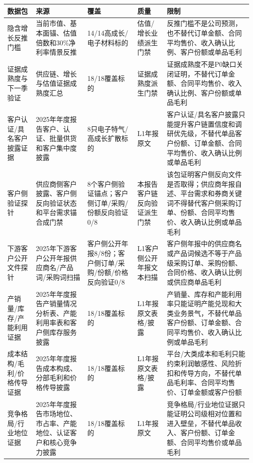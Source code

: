 \begin{exhibitbox}[结构化数据源健康（3）]
\scriptsize
\begin{tabularx}{\exhibitboxwidth}{L{2.1cm} L{2.4cm} L{2.4cm} L{1.5cm} X}
\toprule
\textbf{数据包} & \textbf{来源} & \textbf{覆盖} & \textbf{质量} & \textbf{限制} \\
\midrule
隐含增长反推门槛 & 当前市值、基本面锚、估值倍数和30\%净利率情景反推 & 14/14高成长/电子材料标的 & 估值/增长业绩派生门禁 & 反推门槛不是公司预测，也不替代订单金额、合同平均售价、收入确认比例、客户份额或单品毛利 \\
证据成熟度与下一季验证 & 供应链、增长与估值证据成熟度汇总 & 18/18覆盖标的 & 证据成熟度派生门禁 & 证据成熟度不是P0缺口关闭证明，不替代订单金额、合同平均售价、收入确认比例、客户份额或单品毛利 \\
客户认证/具名客户披露证据 & 2025年年度报告客户、认证、批量供货和客户集中度披露 & 8只电子特气/高成长扩散标的 & L1年报原文 & 客户认证/具名客户披露只能提升客户链置信度和调研优先级，不替代单品客户份额、订单金额、合同平均售价、收入确认比例或单品毛利 \\
客户侧验证探针 & 供应商侧客户披露、客户侧反向验证状态和平台需求锚合成门禁 & 8个客户侧验证锚点；客户侧订单/采购/份额反向验证0/8 & 本报告客户链反向验证派生门禁 & 该包证明客户侧反向文件是否取得；供应商年报自述、平台需求和券商关键词不得替代客户侧采购订单、份额、合同平均售价、收入确认比例或单品毛利 \\
下游客户公开文件探针 & 2025年下游客户公开年报供应商名/产品词/采购词扫描 & 客户侧公开年报8/8份；客户侧订单/采购/份额/价格反向验证0/8 & L1客户侧公开年报文本扫描 & 客户侧年报中的供应商名或产品词候选不等于产品级采购订单、采购份额、合同价格、收入确认比例或供应商单品毛利 \\
产销量/库存/产能利用证据 & 2025年年度报告产销量情况分析表、产能利用率表和客户侧库存服务披露 & 18/18覆盖标的 & L1年报原文表格/披露 & 产销量、库存和产能利用率只能证明产能兑现和大类业务景气，不替代单品客户份额、订单金额、合同平均售价、收入确认比例或单品毛利 \\
成本结构/毛利/价格传导证据 & 2025年年度报告成本构成、分部毛利和价格传导披露 & 18/18覆盖标的 & L1年报原文表格/披露 & 平台/大类成本和毛利只能约束利润敏感性、风险折扣和传导方向，不替代单品毛利率、合同平均售价、订单金额或客户份额 \\
竞争格局/行业地位证据 & 2025年年度报告市场地位、市占率、产能地位、认证客户和核心竞争力披露 & 18/18覆盖标的 & L1年报原文 & 竞争格局/行业地位证据只能证明公司级相对位置和进入壁垒，不替代单品收入、客户份额、订单金额、合同平均售价或单品毛利 \\
\bottomrule
\end{tabularx}
\end{exhibitbox}

